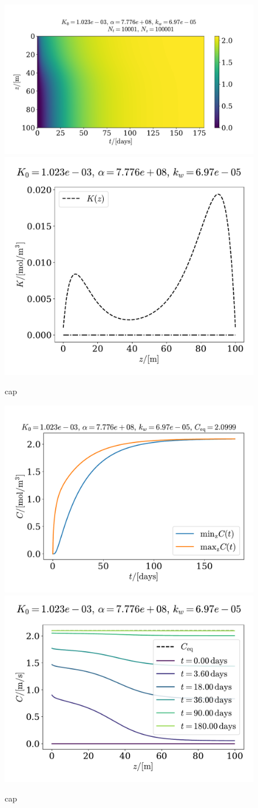 \documentclass{article}
\begin{document}
    \begin{figure}
        \centering
        \includegraphics[width=.65\textwidth]{../plots/prob2}
        \includegraphics[width=.3\textwidth]{../plots/prob2_K}
        \caption{cap}
        \label{prob2}
    \end{figure}

    \begin{figure}
        \centering
        \includegraphics[width=.47\textwidth]{../plots/prob2_minmax}
        \includegraphics[width=.52\textwidth]{../plots/prob2_i}
        \caption{cap}
        \label{prob2 minmax}
    \end{figure}
\end{document}
